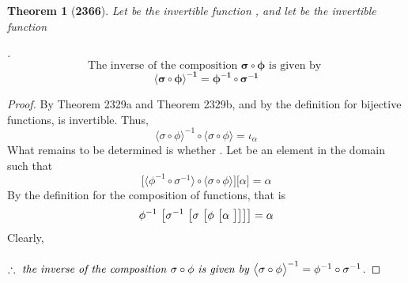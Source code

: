 \documentclass[preview]{standalone}
\newtheorem{theorem}{Theorem}
\begin{document}
\begin{theorem}[\textbf{2366}]
    Let \bm{$\sigma$} be the invertible function 
    \bm{$\sigma : \Theta \rightarrow \Omega$}, 
    and let \bm{$\phi$} be the invertible function 
    \raggedright \bm{$\phi : \Phi \rightarrow \Theta$}. 
    \begin{equation*}
        \text{The inverse of the composition }
        \bm{\sigma \circ \phi}
        \text{ is given by }
    \end{equation*}
    \begin{equation*}
        \bm{
            \big \langle \sigma \circ \phi \big \rangle ^{-1} 
                = \phi ^{-1} \circ \sigma ^{-1}
            }
    \end{equation*}
\end{theorem}

\begin{proof}
    By Theorem 2329a and Theorem 2329b, and by the definition for bijective functions, 
    \bm{$\sigma \circ \phi$} is invertible. 
    Thus, 
    \begin{equation*}
        \big \langle \sigma \circ \phi \big \rangle ^{-1} 
            \circ 
        \big \langle \sigma \circ \phi \big \rangle 
            = 
        \iota_{\alpha}
    \end{equation*}
    What remains to be determined is whether 
    . 
    Let \bm{$\alpha$} be an element in the domain \bm{$\Phi$} such that 
    \begin{equation*}
        \big[
            \big \langle \phi ^{-1} \circ \sigma ^{-1} \big \rangle 
                \circ 
            \big \langle \sigma \circ \phi \big \rangle
        \big] 
            \big[ \alpha \big] 
            = 
        \alpha
    \end{equation*}
    By the definition for the composition of functions, 
    that is 
    \begin{equation*}
        \phi ^{-1} \text{\space} \big[ 
            \sigma ^{-1} \text{\space} \big[ 
                \sigma \text{\space} \big[ 
                    \phi \text{\space} \big[
                        \alpha \text{\space}
                    \big]
                \big]
            \big]
        \big]
             = 
        \alpha
    \end{equation*}
    Clearly, 
    \\ \\
    $\therefore \text{ \emph{the inverse of the composition} } \relax{
        \sigma \circ \phi 
        \text{ \emph{is given by} }
        \big \langle \sigma \circ \phi \big \rangle ^{-1} 
            = 
        \phi^{-1} \circ \sigma^{-1}
    }$.
\end{proof}
\end{document}
